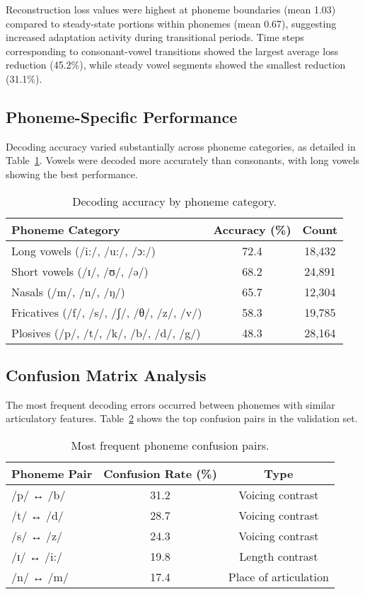 Reconstruction loss values were highest at phoneme boundaries (mean 1.03) compared to steady-state portions within phonemes (mean 0.67), suggesting increased adaptation activity during transitional periods. Time steps corresponding to consonant-vowel transitions showed the largest average loss reduction (45.2\%), while steady vowel segments showed the smallest reduction (31.1\%).

\subsection{Phoneme-Specific Performance}

Decoding accuracy varied substantially across phoneme categories, as detailed in Table~\ref{tab:phoneme_performance}. Vowels were decoded more accurately than consonants, with long vowels showing the best performance.

\begin{table}[h]
\centering
\caption{Decoding accuracy by phoneme category.}
\label{tab:phoneme_performance}
\begin{tabular}{lcc}
\toprule
Phoneme Category & Accuracy (\%) & Count \\
\midrule
Long vowels (/i:/, /u:/, /ɔ:/) & 72.4 & 18,432 \\
Short vowels (/ɪ/, /ʊ/, /ə/) & 68.2 & 24,891 \\
Nasals (/m/, /n/, /ŋ/) & 65.7 & 12,304 \\
Fricatives (/f/, /s/, /ʃ/, /θ/, /z/, /v/) & 58.3 & 19,785 \\
Plosives (/p/, /t/, /k/, /b/, /d/, /g/) & 48.3 & 28,164 \\
\bottomrule
\end{tabular}
\end{table}

\subsection{Confusion Matrix Analysis}

The most frequent decoding errors occurred between phonemes with similar articulatory features. Table~\ref{tab:confusion_pairs} shows the top confusion pairs in the validation set.

\begin{table}[h]
\centering
\caption{Most frequent phoneme confusion pairs.}
\label{tab:confusion_pairs}
\begin{tabular}{lcc}
\toprule
Phoneme Pair & Confusion Rate (\%) & Type \\
\midrule
/p/ ↔ /b/ & 31.2 & Voicing contrast \\
/t/ ↔ /d/ & 28.7 & Voicing contrast \\
/s/ ↔ /z/ & 24.3 & Voicing contrast \\
/ɪ/ ↔ /i:/ & 19.8 & Length contrast \\
/n/ ↔ /m/ & 17.4 & Place of articulation \\
\bottomrule
\end{tabular}
\end{table}


